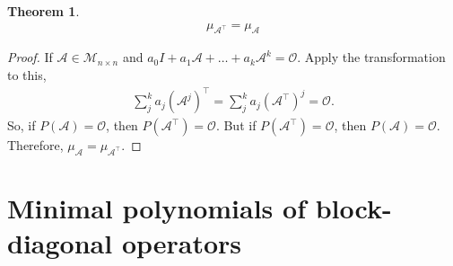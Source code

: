 \documentclass{book}
\theoremstyle{definition}
\newtheorem{thm}{Theorem}[section]
\newcommand{\A}{\mathcal{A}}
\newcommand{\M}{\mathcal{M}}
\begin{document}
\begin{thm}
	\begin{align*}
	\boxed{\mu_{\A^\top} = \mu_\A}
	\end{align*}
	
	\begin{proof}
		If $\A\in \M_{n\times n}$ and $a_0 I + a_1 \A + \dots + a_k \A^k = \mathcal{O}$. Apply the transformation to this,
		\begin{align*}
		\sum^k_j a_j (\A^j)^\top = \sum^k_j a_j (\A^\top)^j = \mathcal{O}.
		\end{align*}
		So, if $P(\A) = \mathcal{O}$, then $P(\A^\top) = \mathcal{O}$. But if $P(\A^\top) = \mathcal{O}$, then $P(\A) = \mathcal{O}$. Therefore, $\mu_\A = \mu_{\A^\top}$.  
	\end{proof}
\end{thm}


\section{Minimal polynomials of block-diagonal operators}
\end{document}
